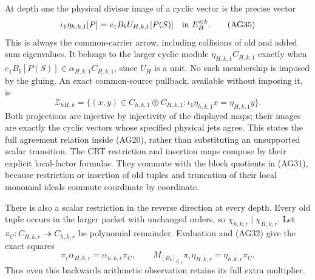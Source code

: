 At depth one the physical divisor image of a cyclic vector is
the precise vector
\[
 \iota_1\eta_{h,k,1}[P]
       =e_1B_bU_{H,k,1}[P(S)]\quad\hbox{in }E_H^{\otimes k}.
 \tag{AG35}
\]
This is always the common-carrier arrow, including collisions of
old and added sum eigenvalues.  It belongs to the larger cyclic
module $\eta_{H,k,1}C_{H,k,1}$ exactly when
$e_1B_b[P(S)]\in\alpha_{H,k,1}C_{H,k,1}$, since $U_H$
is a unit.  No such membership is imposed by the gluing.
An exact common-source pullback, available without imposing it, is
\[
 \mathcal Z_{hH,k}=\{(x,y)\in C_{h,k,1}\oplus C_{H,k,1}:
        \iota_1\eta_{h,k,1}x=\eta_{H,k,1}y\}.
 \tag{AG36}
\]
Both projections are injective by injectivity of the displayed
maps; their images are exactly the cyclic vectors whose specified
physical jets agree.  This states the full agreement relation
inside (AG20), rather than substituting an unsupported scalar
transition.  The CRT restriction and insertion maps compose by their
explicit local-factor formulas.  They commute with the
block quotients in (AG31), because restriction or insertion of
old tuples and truncation of their local monomial ideals commute
coordinate by coordinate.

There is also a scalar restriction in the reverse direction at
every depth.  Every old tuple occurs in the larger packet with
unchanged orders, so $\chi_{h,k,r}\mid\chi_{H,k,r}$.  Let
$\pi_C:C_{H,k,r}\twoheadrightarrow C_{h,k,r}$ be polynomial
remainder.  Evaluation and (AG32) give the exact squares
\[
 \pi_r\alpha_{H,k,r}=\alpha_{h,k,r}\pi_C,\qquad
 M_{[B_b]_{I_{h,k}^r}}\pi_r\eta_{H,k,r}
          =\eta_{h,k,r}\pi_C.
 \tag{AG36a}
\]
Thus even this backwards arithmetic observation retains its full
extra multiplier.

